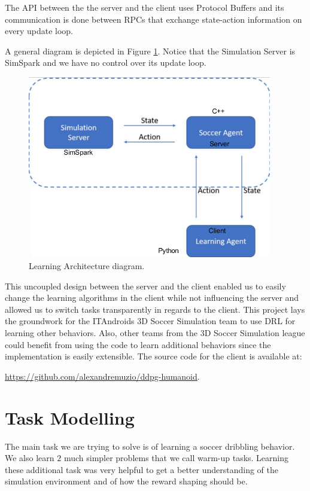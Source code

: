 The API between the the server and the client uses Protocol Buffers and its communication is done between RPCs 
that exchange state-action information on every update loop.

A general diagram is depicted in Figure \ref{fig:architecture}. Notice that the Simulation Server is SimSpark
and we have no control over its update loop.

\begin{figure}[H]
    \centering
    \includegraphics[width=0.95\textwidth]{Chapter5/architecture.png}
    \caption{Learning Architecture diagram.}
    \label{fig:architecture}
\end{figure}

This uncoupled design between the server and the client enabled us to easily change the learning algorithms 
in the client while not influencing the server and allowed us to switch tasks transparently in regards to the client.
This project lays the groundwork for the ITAndroids 3D Soccer Simulation team to use DRL for learning other
behaviors. Also, other teams from the 3D Soccer Simulation league could benefit from using the code to learn additional
 behaviors since the implementation is easily extensible.
The source code for the client is available at:

\url{https://github.com/alexandremuzio/ddpg-humanoid}.


\section{Task Modelling}
\label{sec:tasks}

The main task we are trying to solve is of learning a soccer dribbling behavior.
We also learn $2$ much simpler problems that we call warm-up tasks. 
Learning these additional task was very helpful to get a better understanding
of the simulation environment and of how the reward shaping should be.

